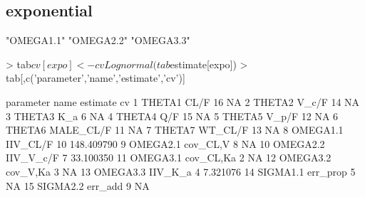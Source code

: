 \subsection{exponential}
\begin{Schunk}
\begin{Soutput}
[1] "OMEGA1.1" "OMEGA2.2" "OMEGA3.3"
\end{Soutput}
\begin{Sinput}
> tab$cv[expo] <- cvLognormal(tab$estimate[expo])
> tab[,c('parameter','name','estimate','cv')]
\end{Sinput}
\begin{Soutput}
   parameter      name estimate         cv
1     THETA1      CL/F       16         NA
2     THETA2     V_c/F       14         NA
3     THETA3       K_a        6         NA
4     THETA4       Q/F       15         NA
5     THETA5     V_p/F       12         NA
6     THETA6 MALE_CL/F       11         NA
7     THETA7   WT_CL/F       13         NA
8   OMEGA1.1  IIV_CL/F       10 148.409790
9   OMEGA2.1  cov_CL,V        8         NA
10  OMEGA2.2 IIV_V_c/F        7  33.100350
11  OMEGA3.1 cov_CL,Ka        2         NA
12  OMEGA3.2  cov_V,Ka        3         NA
13  OMEGA3.3   IIV_K_a        4   7.321076
14  SIGMA1.1  err_prop        5         NA
15  SIGMA2.2   err_add        9         NA
\end{Soutput}
\end{Schunk}
